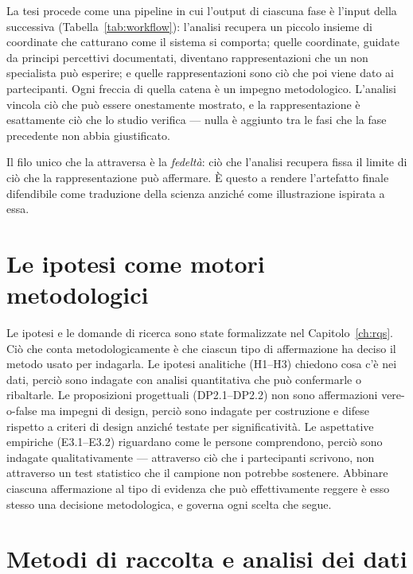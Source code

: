 La tesi procede come una pipeline in cui l'output di ciascuna fase è l'input della successiva (Tabella~\ref{tab:workflow}): l'analisi recupera un piccolo insieme di coordinate che catturano come il sistema si comporta; quelle coordinate, guidate da principi percettivi documentati, diventano rappresentazioni che un non specialista può esperire; e quelle rappresentazioni sono ciò che poi viene dato ai partecipanti. Ogni freccia di quella catena è un impegno metodologico. L'analisi vincola ciò che può essere onestamente mostrato, e la rappresentazione è esattamente ciò che lo studio verifica --- nulla è aggiunto tra le fasi che la fase precedente non abbia giustificato.



Il filo unico che la attraversa è la \emph{fedeltà}: ciò che l'analisi recupera fissa il limite di ciò che la rappresentazione può affermare. È questo a rendere l'artefatto finale difendibile come traduzione della scienza anziché come illustrazione ispirata a essa.

\section{Le ipotesi come motori metodologici}
\label{sec:hypotheses-drivers}

Le ipotesi e le domande di ricerca sono state formalizzate nel Capitolo~\ref{ch:rqs}. Ciò che conta metodologicamente è che ciascun tipo di affermazione ha deciso il metodo usato per indagarla. Le ipotesi analitiche (H1--H3) chiedono cosa c'è nei dati, perciò sono indagate con analisi quantitativa che può confermarle o ribaltarle. Le proposizioni progettuali (DP2.1--DP2.2) non sono affermazioni vere-o-false ma impegni di design, perciò sono indagate per costruzione e difese rispetto a criteri di design anziché testate per significatività. Le aspettative empiriche (E3.1--E3.2) riguardano come le persone comprendono, perciò sono indagate qualitativamente --- attraverso ciò che i partecipanti scrivono, non attraverso un test statistico che il campione non potrebbe sostenere. Abbinare ciascuna affermazione al tipo di evidenza che può effettivamente reggere è esso stesso una decisione metodologica, e governa ogni scelta che segue.

\section{Metodi di raccolta e analisi dei dati}
\label{sec:data-methods}

